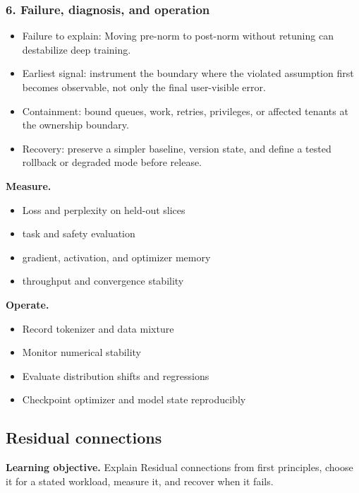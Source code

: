 \subsubsection*{6. Failure, diagnosis, and operation}
\begin{itemize}
\item Failure to explain: Moving pre-norm to post-norm without retuning can destabilize deep training.
\item Earliest signal: instrument the boundary where the violated assumption first becomes observable, not only the final user-visible error.
\item Containment: bound queues, work, retries, privileges, or affected tenants at the ownership boundary.
\item Recovery: preserve a simpler baseline, version state, and define a tested rollback or degraded mode before release.
\end{itemize}
\textbf{Measure.}\begin{itemize}
\item Loss and perplexity on held-out slices
\item task and safety evaluation
\item gradient, activation, and optimizer memory
\item throughput and convergence stability
\end{itemize}
\textbf{Operate.}\begin{itemize}
\item Record tokenizer and data mixture
\item Monitor numerical stability
\item Evaluate distribution shifts and regressions
\item Checkpoint optimizer and model state reproducibly
\end{itemize}
\subsection{Residual connections}
\textbf{Learning objective.} Explain Residual connections from first principles, choose it for a stated workload, measure it, and recover when it fails.
